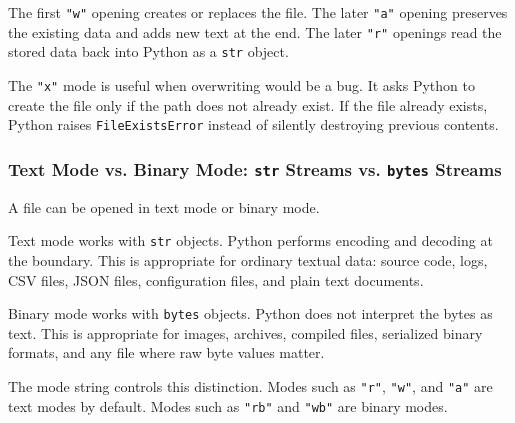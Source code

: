 The first \texttt{"w"} opening creates or replaces the file. The later \texttt{"a"} opening preserves the existing data and adds new text at the end. The later \texttt{"r"} openings read the stored data back into Python as a \texttt{str} object.

The \texttt{"x"} mode is useful when overwriting would be a bug. It asks Python to create the file only if the path does not already exist. If the file already exists, Python raises \texttt{FileExistsError} instead of silently destroying previous contents.

\subsubsection{Text Mode vs. Binary Mode: \texttt{str} Streams vs. \texttt{bytes} Streams}

A file can be opened in text mode or binary mode.

Text mode works with \texttt{str} objects. Python performs encoding and decoding at the boundary. This is appropriate for ordinary textual data: source code, logs, CSV files, JSON files, configuration files, and plain text documents.

Binary mode works with \texttt{bytes} objects. Python does not interpret the bytes as text. This is appropriate for images, archives, compiled files, serialized binary formats, and any file where raw byte values matter.

The mode string controls this distinction. Modes such as \texttt{"r"}, \texttt{"w"}, and \texttt{"a"} are text modes by default. Modes such as \texttt{"rb"} and \texttt{"wb"} are binary modes.

